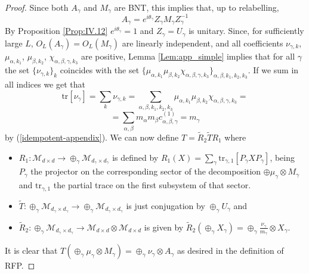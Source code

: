 \documentclass{elsarticle}
\newcommand{\be}{\begin{equation}}
\newcommand{\ee}{\end{equation}}
\newcommand{\tr}{\mathrm{tr}}
\begin{document}
\begin{proof}
    Since both $A_\gamma$ and $M_\gamma$ are BNT, this implies that, up to relabelling,
    \be
        A_\gamma = e^{i\theta_\gamma} Z_\gamma M_\gamma Z_\gamma^{-1}
    \ee
    By Proposition \ref{Prop:IV.12} $e^{i\theta_\gamma}=1$ and $Z_\gamma=U_\gamma$ is unitary.
    Since, for sufficiently large $L$, $O_L(A_\gamma)=O_L(M_\gamma)$ are linearly independent, and all coefficients $\nu_{\gamma,k}$, $\mu_{\alpha,k_1}$, $\mu_{\beta,k_2}$, $\chi_{\alpha,\beta,\gamma,k_3}$ are positive, Lemma \ref{Lem:app_simple} implies that for all $\gamma$ the set $\{\nu_{\gamma,k}\}_k$ coincides with the set $\{\mu_{\alpha,k_1}\mu_{\beta,k_2}\chi_{\alpha,\beta,\gamma,k_3}\}_{\alpha,\beta,k_1,k_2,k_3}$. If we sum in all indices we get that
    \be
        \tr[\nu_\gamma]=\sum_k\nu_{\gamma,k}=\sum_{\alpha,\beta,k_1,k_2,k_3}\mu_{\alpha,k_1}\mu_{\beta,k_2}\chi_{\alpha,\beta,\gamma,k_3}=
    \ee
    \be
    = \sum_{\alpha,\beta} m_\alpha m_\beta c_{\alpha,\beta,\gamma}^{(1)}=m_\gamma
    \ee
    by (\ref{idempotent-appendix}). We can now define $T=\tilde{R}_2\tilde{T}R_1$  where
    \begin{itemize}
        \item $R_1:\mathcal{M}_{d\times d}\longrightarrow \oplus_\gamma\mathcal{M}_{d_\gamma\times d_\gamma}$
              is defined by  $R_1(X)=\sum_\gamma \tr_{\gamma,1}[P_\gamma X P_\gamma]$, being $P_\gamma$ the projector on the corresponding sector of the decomposition $\oplus \mu_\gamma\otimes M_\gamma$ and $\tr_{\gamma,1}$ the partial trace on the first subsystem of that sector.
        \item $\tilde{T}:\oplus_\gamma\mathcal{M}_{d_\gamma\times d_\gamma}\longrightarrow \oplus_\gamma\mathcal{M}_{d_\gamma\times d_\gamma}$ is just conjugation by $\oplus_\gamma U_\gamma$ and
        \item $\tilde{R}_2: \oplus_\gamma\mathcal{M}_{d_\gamma\times d_\gamma}\longrightarrow \mathcal{M}_{d\times d}\otimes \mathcal{M}_{d\times d}$ is given by
              $\tilde{R}_2(\oplus_\gamma X_\gamma)= \oplus_\gamma \frac{\nu_\gamma}{m_\gamma} \otimes X_\gamma$.
    \end{itemize}

    It is clear that $T(\oplus_\gamma \mu_\gamma\otimes M_\gamma)=\oplus_\gamma \nu_\gamma \otimes A_\gamma$ as desired in the definition of RFP.


\end{proof}
\end{document}
